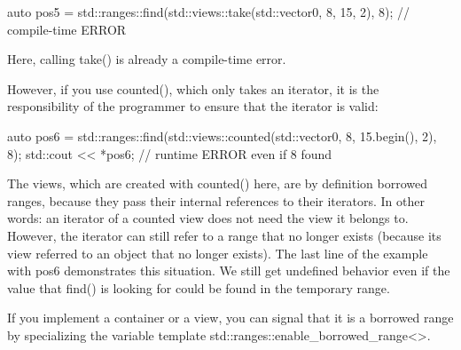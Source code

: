 \begin{itemize}
\begin{cpp}
auto pos5 = std::ranges::find(std::views::take(std::vector{0, 8, 15}, 2), 8);
// compile-time ERROR
\end{cpp}

Here, calling take() is already a compile-time error.

However, if you use counted(), which only takes an iterator, it is the responsibility of the programmer to ensure that the iterator is valid:

\begin{cpp}
auto pos6 = std::ranges::find(std::views::counted(std::vector{0, 8, 15}.begin(),
							2), 8);
std::cout << *pos6; // runtime ERROR even if 8 found
\end{cpp}

The views, which are created with counted() here, are by definition borrowed ranges, because they pass their internal references to their iterators. In other words: an iterator of a counted view does not need the view it belongs to. However, the iterator can still refer to a range that no longer exists (because its view referred to an object that no longer exists). The last line of the example with pos6 demonstrates this situation. We still get undefined behavior even if the value that find() is looking for could be found in the temporary range.

\end{itemize}

If you implement a container or a view, you can signal that it is a borrowed range by specializing the variable template std::ranges::enable\_borrowed\_range<>.








